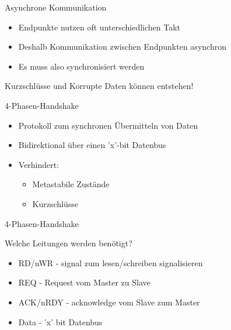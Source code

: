 
  \begin{frame} {Asynchrone Kommunikation}
    \begin{block} {}
      \begin{itemize}
        \item Endpunkte nutzen oft unterschiedlichen Takt
        \item Deshalb Kommunikation zwischen Endpunkten asynchron
        \item Es muss also synchronisiert werden
      \end{itemize}
    \end{block}
    \begin{alertblock} {}
      Kurzschlüsse und Korrupte Daten können entstehen!
    \end{alertblock}
  \end{frame}


  \begin{frame} {4-Phasen-Handshake}
    \begin{block} {}
      \begin{itemize}
        \item Protokoll zum synchronen Übermitteln von Daten
        \item Bidirektional über einen 'x'-bit Datenbus
        \item Verhindert:
        \begin{itemize}
          \item Metastabile Zustände
          \item Kurzschlüsse
        \end{itemize}
      \end{itemize}
    \end{block}
  \end{frame}

  \begin{frame} {4-Phasen-Handshake}
    \begin{block} {Welche Leitungen werden benötigt?}
      \begin{itemize}
        \item RD/nWR - signal zum lesen/schreiben signalisieren
        \item REQ - Request vom Master zu Slave
        \item ACK/nRDY - acknowledge vom Slave zum Master
        \item Data - 'x' bit Datenbus
      \end{itemize}
    \end{block}
  \end{frame}

